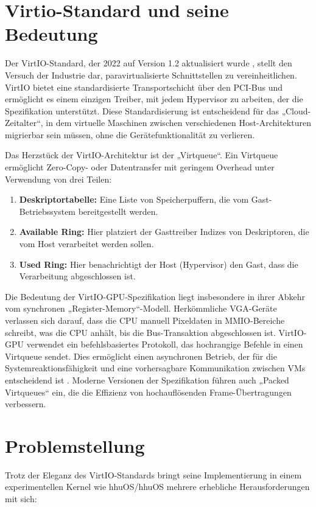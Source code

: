 \section{Virtio-Standard und seine Bedeutung}
Der VirtIO-Standard, der 2022 auf Version 1.2 aktualisiert wurde \cite{Virtio12}, stellt den Versuch der Industrie dar, paravirtualisierte Schnittstellen zu vereinheitlichen. VirtIO bietet eine standardisierte Transportschicht über den PCI-Bus und ermöglicht es einem einzigen Treiber, mit jedem Hypervisor zu arbeiten, der die Spezifikation unterstützt. Diese Standardisierung ist entscheidend für das „Cloud-Zeitalter“, in dem virtuelle Maschinen zwischen verschiedenen Host-Architekturen migrierbar sein müssen, ohne die Gerätefunktionalität zu verlieren.

Das Herzstück der VirtIO-Architektur ist der „Virtqueue“. Ein Virtqueue ermöglicht Zero-Copy- oder Datentransfer mit geringem Overhead unter Verwendung von drei Teilen:
\begin{enumerate}
    \item \textbf{Deskriptortabelle:} Eine Liste von Speicherpuffern, die vom Gast-Betriebssystem bereitgestellt werden.
    \item \textbf{Available Ring:} Hier platziert der Gasttreiber Indizes von Deskriptoren, die vom Host verarbeitet werden sollen.
    \item \textbf{Used Ring:} Hier benachrichtigt der Host (Hypervisor) den Gast, dass die Verarbeitung abgeschlossen ist.
\end{enumerate}

Die Bedeutung der VirtIO-GPU-Spezifikation liegt insbesondere in ihrer Abkehr vom synchronen „Register-Memory“-Modell. Herkömmliche VGA-Geräte verlassen sich darauf, dass die CPU manuell Pixeldaten in MMIO-Bereiche schreibt, was die CPU anhält, bis die Bus-Transaktion abgeschlossen ist. VirtIO-GPU verwendet ein befehlsbasiertes Protokoll, das hochrangige Befehle in einen Virtqueue sendet. Dies ermöglicht einen asynchronen Betrieb, der für die Systemreaktionsfähigkeit und eine vorhersagbare Kommunikation zwischen VMs entscheidend ist \cite{Zhao2022}. Moderne Versionen der Spezifikation führen auch „Packed Virtqueues“ ein, die die Effizienz von hochauflösenden Frame-Übertragungen verbessern.

\section{Problemstellung}
Trotz der Eleganz des VirtIO-Standards bringt seine Implementierung in einem experimentellen Kernel wie hhuOS/hhuOS mehrere erhebliche Herausforderungen mit sich:

